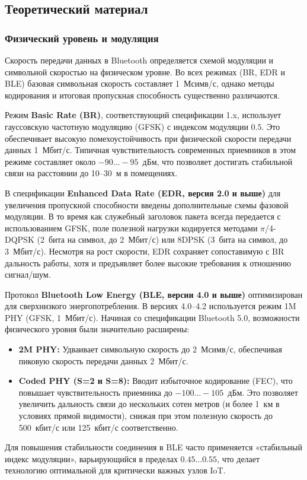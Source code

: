 \subsection{Теоретический материал}

\subsubsection{Физический уровень и модуляция}
Скорость передачи данных в Bluetooth определяется схемой модуляции и символьной скоростью на физическом уровне. Во всех режимах (BR, EDR и BLE) базовая символьная скорость составляет 1~Мсимв/с, однако методы кодирования и итоговая пропускная способность существенно различаются.

Режим \textbf{Basic Rate (BR)}, соответствующий спецификации 1.x, использует гауссовскую частотную модуляцию (GFSK) с индексом модуляции $0.5$. Это обеспечивает высокую помехоустойчивость при физической скорости передачи данных 1~Мбит/с. Типичная чувствительность современных приемников в этом режиме составляет около $-90\dots-95$~дБм, что позволяет достигать стабильной связи на расстоянии до 10--30~м в помещениях.

В спецификации \textbf{Enhanced Data Rate (EDR, версия 2.0 и выше)} для увеличения пропускной способности введены дополнительные схемы фазовой модуляции. В то время как служебный заголовок пакета всегда передается с использованием GFSK, поле полезной нагрузки кодируется методами $\pi$/4-DQPSK (2~бита на символ, до 2~Мбит/с) или 8DPSK (3~бита на символ, до 3~Мбит/с). Несмотря на рост скорости, EDR сохраняет сопоставимую с BR дальность работы, хотя и предъявляет более высокие требования к отношению сигнал/шум.

Протокол \textbf{Bluetooth Low Energy (BLE, версии 4.0 и выше)} оптимизирован для сверхнизкого энергопотребления. В версиях 4.0--4.2 используется режим 1M PHY (GFSK, 1~Мбит/с). Начиная со спецификации Bluetooth 5.0, возможности физического уровня были значительно расширены:
\begin{itemize}
    \item \textbf{2M PHY:} Удваивает символьную скорость до 2~Мсимв/с, обеспечивая пиковую скорость передачи данных 2~Мбит/с.
    \item \textbf{Coded PHY (S=2 и S=8):} Вводит избыточное кодирование (FEC), что повышает чувствительность приемника до $-100\dots-105$~дБм. Это позволяет увеличить дальность связи до нескольких сотен метров (и более 1~км в условиях прямой видимости), снижая при этом полезную скорость до 500~кбит/с или 125~кбит/с соответственно.
\end{itemize}
Для повышения стабильности соединения в BLE часто применяется «стабильный индекс модуляции», варьирующийся в пределах $0.45\dots0.55$, что делает технологию оптимальной для критически важных узлов IoT.

